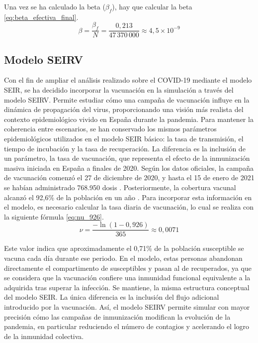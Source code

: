 Una vez se ha calculado la beta ($\beta_f$), hay que calcular la beta \eqref{eq:beta_efectiva_final}.
\begin{equation}
\beta = \frac{\beta_f}{N} = \frac{0{,}213}{47\,370\,000} \approx 4{,}5 \times 10^{-9}
\label{eq:beta_efectiva_final}
\end{equation}



\subsection{Modelo SEIRV}
Con el fin de ampliar el análisis realizado sobre el COVID-19 mediante el modelo SEIR, se ha decidido incorporar la vacunación en la simulación a través del modelo SEIRV. Permite estudiar cómo una campaña de vacunación influye en la dinámica de propagación del virus, proporcionando una visión más realista del contexto epidemiológico vivido en España durante la pandemia.
Para mantener la coherencia entre escenarios, se han conservado los mismos parámetros epidemiológicos utilizados en el modelo SEIR básico: la tasa de transmisión, el tiempo de incubación y la tasa de recuperación. La diferencia es la inclusión de un parámetro, la tasa de vacunación, que representa el efecto de la inmunización masiva iniciada en España a finales de 2020.
Según los datos oficiales, la campaña de vacunación comenzó el 27 de diciembre de 2020, y hasta el 15 de enero de 2021 se habían administrado 768.950 dosis \cite{sanidad_giv_20210115}. Posteriormente, la cobertura vacunal alcanzó el 92,6\% de la población en un año \cite{sanidad_historico_covid}. Para incorporar esta información en el modelo, es necesario calcular la tasa diaria de vacunación, lo cual se realiza con la siguiente fórmula \eqref{eq:nu_926}.
\begin{equation}
\nu = \frac{-\ln(1 - 0{,}926)}{365} \approx 0{,}0071
\label{eq:nu_926}
\end{equation}

Este valor indica que aproximadamente el 0,71\% de la población susceptible se vacuna cada día durante ese periodo. En el modelo, estas personas abandonan directamente el compartimento de susceptibles y pasan al de recuperados, ya que se considera que la vacunación confiere una inmunidad funcional equivalente a la adquirida tras superar la infección.
Se mantiene, la misma estructura conceptual del modelo SEIR. La única diferencia es la inclusión del flujo adicional introducido por la vacunación. Así, el modelo SEIRV permite simular con mayor precisión cómo las campañas de inmunización modifican la evolución de la pandemia, en particular reduciendo el número de contagios y acelerando el logro de la inmunidad colectiva.



